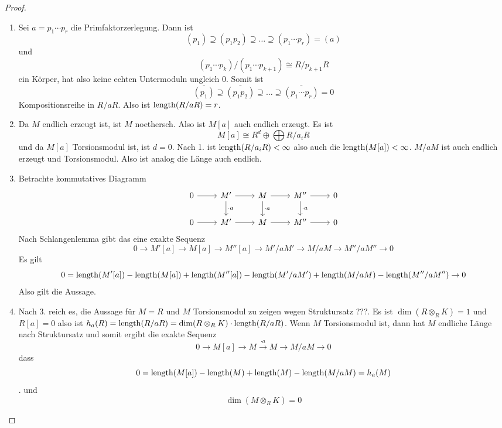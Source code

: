 \begin{proof}
    \begin{enumerate}
        \item Sei $a=p_1\cdots p_r$ die Primfaktorzerlegung. Dann ist $$(p_1)\supseteq (p_1p_2)\supseteq \dots\supseteq (p_1\cdots p_r)=(a)$$ und 
        $$(p_1\cdots p_k)/(p_1\cdots p_{k+1})\cong R/p_{k+1}R$$ ein Körper, hat also keine echten Untermoduln ungleich $0$.
        Somit ist $$\bar{(p_1)}\supseteq \bar{(p_1p_2)}\supseteq \dots\supseteq \bar{(p_1\cdots p_r)}=0$$ Kompositionsreihe in $R/aR$. Also ist $\operatorname{length}(R/aR)=r$.
        \item Da $M$ endlich erzeugt ist, ist $M$ noethersch. Also ist $M[a]$ auch endlich erzeugt. Es ist 
        $$M[a]\cong R^d\oplus\bigoplus R/a_iR$$ und da $M[a]$ Torsionsmodul ist, ist $d=0$.
        Nach 1. ist $\operatorname{length}(R/a_iR)<\infty$ also auch die $\operatorname{length}(M[a])<\infty$.
        $M/aM$ ist auch endlich erzeugt und Torsionsmodul. Also ist analog die Länge auch endlich.
        \item Betrachte kommutatives Diagramm 
        $$%
\begin{tikzcd}
0 \arrow[r] & M' \arrow[r] \arrow[d, "\cdot a"] & M \arrow[r] \arrow[d, "\cdot a"] & M'' \arrow[r] \arrow[d, "\cdot a"] & 0 \\
0 \arrow[r] & M' \arrow[r]                      & M \arrow[r]                      & M'' \arrow[r]                      & 0
\end{tikzcd}$$
Nach Schlangenlemma gibt das eine exakte Sequenz 
$$0\to M'[a]\to M[a]\to M''[a]\to M'/aM'\to M/aM\to M''/aM''\to 0$$
Es gilt $$0=\operatorname{length}(M'[a])-\operatorname{length}(M[a])+\operatorname{length}(M''[a])-\operatorname{length}(M'/aM')+\operatorname{length}(M/aM)-\operatorname{length}(M''/aM'')\to 0$$ 
Also gilt die Aussage.
\item Nach 3. reich es, die Aussage für $M=R$ und $M$ Torsionsmodul zu zeigen wegen Struktursatz ???.
Es ist $\dim(R\otimes_RK)=1$ und $R[a]=0$ also ist $h_a(R)=\operatorname{length}(R/aR)=\dim(R\otimes_RK)\cdot\operatorname{length}(R/aR)$.
Wenn $M$ Torsionsmodul ist, dann hat $M$ endliche Länge nach Struktursatz und somit ergibt die exakte Sequenz 
$$0\to M[a]\to M\stackrel{\cdot a}{\to}M\to M/aM\to 0$$ dass 
$$0=\operatorname{length}(M[a])-\operatorname{length}(M)+\operatorname{length}(M)-\operatorname{length}(M/aM)=h_a(M)$$.
und $$\dim(M\otimes _RK)=0$$
    \end{enumerate}
\end{proof}
